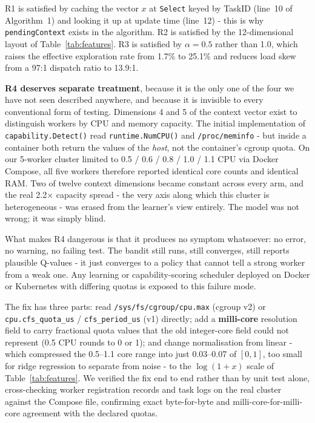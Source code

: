 \documentclass[final,5p,times,twocolumn]{elsarticle}
\begin{document}
R1 is satisfied by caching the vector $x$ at \texttt{Select} keyed by TaskID (line~10 of Algorithm~1) and looking it up at update time (line~12) - this is why \texttt{pendingContext} exists in the algorithm. R2 is satisfied by the 12-dimensional layout of Table~\ref{tab:features}. R3 is satisfied by $\alpha=0.5$ rather than 1.0, which raises the effective exploration rate from 1.7\% to 25.1\% and reduces load skew from a 97:1 dispatch ratio to 13.9:1.

\textbf{R4 deserves separate treatment}, because it is the only one of the four we have not seen described anywhere, and because it is invisible to every conventional form of testing. Dimensions 4 and 5 of the context vector exist to distinguish workers by CPU and memory capacity. The initial implementation of \texttt{capability.Detect()} read \texttt{runtime.NumCPU()} and \texttt{/proc/meminfo} - but inside a container both return the values of the \emph{host}, not the container's cgroup quota. On our 5-worker cluster limited to 0.5 / 0.6 / 0.8 / 1.0 / 1.1 CPU via Docker Compose, all five workers therefore reported identical core counts and identical RAM. Two of twelve context dimensions became constant across every arm, and the real 2.2$\times$ capacity spread - the very axis along which this cluster is heterogeneous - was erased from the learner's view entirely. The model was not wrong; it was simply blind.

What makes R4 dangerous is that it produces no symptom whatsoever: no error, no warning, no failing test. The bandit still runs, still converges, still reports plausible Q-values - it just converges to a policy that cannot tell a strong worker from a weak one. Any learning or capability-scoring scheduler deployed on Docker or Kubernetes with differing quotas is exposed to this failure mode.

The fix has three parts: read \texttt{/sys/fs/cgroup/cpu.max} (cgroup v2) or \texttt{cpu.cfs\_quota\_us} / \texttt{cfs\_period\_us} (v1) directly; add a \textbf{milli-core} resolution field to carry fractional quota values that the old integer-core field could not represent (0.5 CPU rounds to 0 or 1); and change normalisation from linear - which compressed the 0.5--1.1 core range into just 0.03--0.07 of $[0,1]$, too small for ridge regression to separate from noise - to the $\log(1+x)$ scale of Table~\ref{tab:features}. We verified the fix end to end rather than by unit test alone, cross-checking worker registration records and task logs on the real cluster against the Compose file, confirming exact byte-for-byte and milli-core-for-milli-core agreement with the declared quotas.
\end{document}
